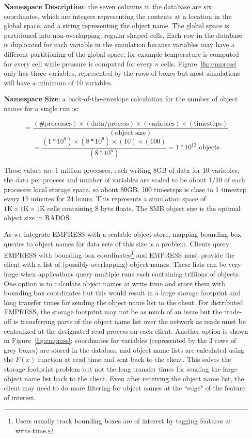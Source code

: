 \textbf{Namespace Description}: the seven columns in the database are six
coordinates, which are integers representing the contents at a location in the
global space, and a string representing the object name. The global space is
partitioned into non-overlapping, regular shaped cells.  Each row in the
database is duplicated for each variable in the simulation because variables
may have a different partitioning of the global space; for example temperature
is computed for every cell while pressure is computed for every \(n\) cells.
Figure~\ref{fig:empress} only has three variables, represented by the rows of
boxes but most simulations will have a minimum of 10 variables.

\textbf{Namespace Size}: a back-of-the-envelope calculation for the number of
object names for a single run is:

\[=\frac
  {(\text{\# processes})\times
   (\text{data/process})\times
   (\text{variables})\times
   (\text{timesteps})}
  {(\text{object size})}
\]
\[=\frac
  {(1*10^6)\times
   (8*10^{9})\times
   (10)\times
   (100)}
   {(8*10^6)}
  = 1*10^{12}
\text{ objects} \]

These values are 1 million processes, each writing 8GB of data for 10
variables; the data per process and number of variables are scaled to be about
1/10 of each processes local storage space, so about 80GB. 100 timesteps is
close to 1 timestep every 15 minutes for 24 hours. This represents a simulation
space of \(1\text{K}\times1\text{K}\times1\text{K}\) cells containing 8 byte
floats.  The 8MB object size is the optimal object size in RADOS.  

As we integrate EMPRESS with a scalable object store, mapping bounding box
queries to object names for data sets of this size is a problem. Clients query
EMPRESS with bounding box coordinates\footnote{Users usually track bounding
boxes are of interest by tagging features at write time.} and EMPRESS must
provide the client with a list of (possibly overlapping) object names.  These
lists can be very large when applications query multiple runs each containing
trillions of objects.  One option is to calculate object names at write time
and store them with bounding box coordinates but this would result in a large
storage footprint and long transfer times for sending the object name list to
the client.  For distributed EMPRESS, the storage footprint may not be as much
of an issue but the trade-off is transferring parts of the object name list
over the network as reads must be centralized at the designated read process on
each client.  Another option is shown in Figure~\ref{fig:empress}; coordinates
for variables (represented by the 3 rows of grey boxes) are stored in the
database and object name lists are calculated using the \(F(x)\) function at
read time and sent back to the client. This solves the storage footprint
problem but not the long transfer times for sending the large object name list
back to the client.  Even after receiving the object name list, the client may
need to do more filtering for object names at the ``edge" of the feature of
interest.

